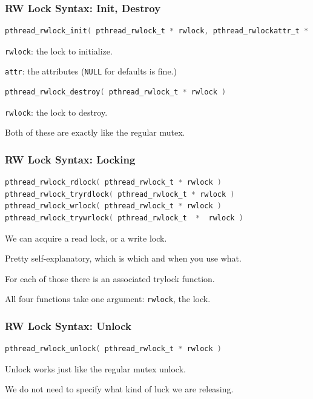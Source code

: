 \begin{frame}[fragile]
	\frametitle{RW Lock Syntax: Init, Destroy}

	\begin{lstlisting}[language=C]
pthread_rwlock_init( pthread_rwlock_t * rwlock, pthread_rwlockattr_t * attr )
\end{lstlisting}

	\texttt{rwlock}: the lock to initialize.

	\texttt{attr}: the attributes (\texttt{NULL} for defaults is fine.)


	\begin{lstlisting}[language=C]
pthread_rwlock_destroy( pthread_rwlock_t * rwlock )
\end{lstlisting}

	\texttt{rwlock}: the lock to destroy.


	Both of these are exactly like the regular mutex.

\end{frame}

\begin{frame}[fragile]
	\frametitle{RW Lock Syntax: Locking}

	\begin{lstlisting}[language=C]
pthread_rwlock_rdlock( pthread_rwlock_t * rwlock )
pthread_rwlock_tryrdlock( pthread_rwlock_t * rwlock )
pthread_rwlock_wrlock( pthread_rwlock_t * rwlock )
pthread_rwlock_trywrlock( pthread_rwlock_t  *  rwlock )
\end{lstlisting}

	We can acquire a read lock, or a write lock.

	Pretty self-explanatory, which is which and when you use what.

	For each of those there is an associated trylock function.

	All four functions take one argument: \texttt{rwlock}, the lock.


\end{frame}


\begin{frame}[fragile]
	\frametitle{RW Lock Syntax: Unlock}

	\begin{lstlisting}[language=C]
pthread_rwlock_unlock( pthread_rwlock_t * rwlock )
\end{lstlisting}

	Unlock works just like the regular mutex unlock.

	We do not need to specify what kind of luck we are releasing.

\end{frame}


